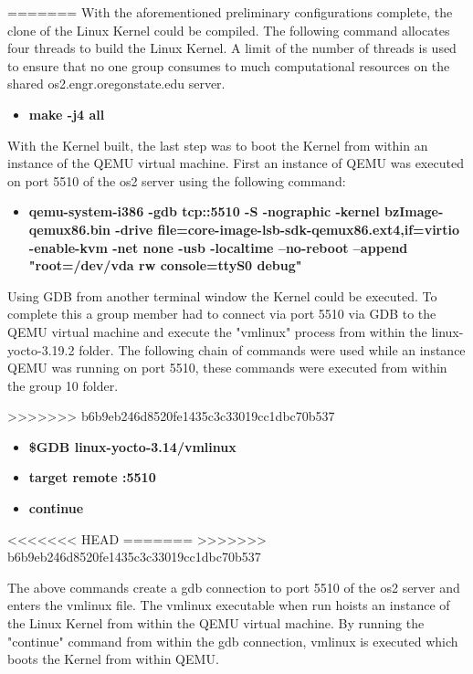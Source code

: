\documentclass[10pt,onecolumn,draftclsnofoot]{IEEEtran} %
\begin{document}
\begin{singlespace}
=======
\hfill\break
  \normalfont \indent With the aforementioned preliminary configurations complete, the clone of the Linux Kernel could be compiled. The following command allocates four threads to build the Linux Kernel. A limit of the number of threads is used to ensure that no one group consumes to much computational resources on the shared os2.engr.oregonstate.edu server.
\hfill\break
  \begin{itemize}
    \item \textbf{make -j4 all}
  \end{itemize}
\hfill\break
  \normalfont \indent With the Kernel built, the last step was to boot the Kernel from within an instance of the QEMU virtual machine. First an instance of QEMU was executed on port 5510 of the os2 server using the following command:
\hfill\break
  \begin{itemize}
    \item \textbf{qemu-system-i386 -gdb tcp::5510 -S -nographic -kernel bzImage-qemux86.bin -drive file=core-image-lsb-sdk-qemux86.ext4,if=virtio -enable-kvm -net none -usb -localtime --no-reboot --append "root=/dev/vda rw console=ttyS0 debug"}
  \end{itemize}
\hfill\break
  \normalfont \indent Using GDB from another terminal window the Kernel could be executed. To complete this a group member had to connect via port 5510 via GDB to the QEMU virtual machine and execute the "vmlinux" process from within the linux-yocto-3.19.2 folder. The following chain of commands were used while an instance QEMU was running on port 5510, these commands were executed from within the group 10 folder.

  \hfill\break
>>>>>>> b6b9eb246d8520fe1435c3c33019cc1dbc70b537
  \begin{itemize}
    \item \textbf{\$GDB linux-yocto-3.14/vmlinux}
    \item \textbf{target remote :5510}
    \item \textbf{continue}
  \end{itemize}
<<<<<<< HEAD
=======
\hfill\break
>>>>>>> b6b9eb246d8520fe1435c3c33019cc1dbc70b537

  \normalfont \indent The above commands create a gdb connection to port 5510 of the os2 server and enters the vmlinux file. The vmlinux executable when run hoists an instance of the Linux Kernel from within the QEMU virtual machine. By running the "continue" command from within the gdb connection, vmlinux is executed which boots the Kernel from within QEMU.



\end{singlespace}
\end{document}
